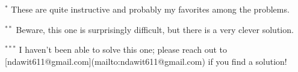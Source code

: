 $^*$ These are quite instructive and probably my favorites among the problems.

$^{**}$ Beware, this one is surprisingly difficult, but there is a very clever solution.

$^{***}$ I haven't been able to solve this one; please reach out to [ndawit611@gmail.com](mailto:ndawit611@gmail.com) if you find a solution!
